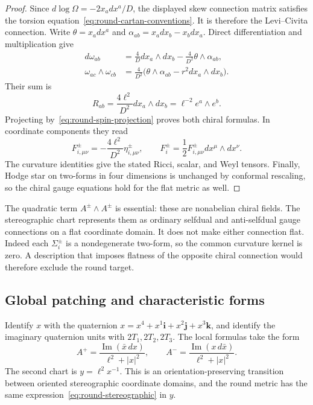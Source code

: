 \documentclass[11pt]{article}
\numberwithin{equation}{section}
\theoremstyle{definition}
\theoremstyle{remark}
\begin{document}
\begin{proof}
Since $d\log\Omega=-2x_a dx^a/D$, the displayed skew connection matrix
satisfies the torsion equation~\eqref{eq:round-cartan-conventions}.  It is
therefore the Levi--Civita connection.  Write $\theta=x_a dx^a$ and
$\alpha_{ab}=x_a dx_b-x_b dx_a$.  Direct differentiation and multiplication
give
\begin{align*}
 d\omega_{ab}
 &=\frac4D dx_a\wedge dx_b-
   \frac4{D^2}\theta\wedge\alpha_{ab},\\
 \omega_{ac}\wedge\omega_{cb}
 &=\frac4{D^2}\bigl(
   \theta\wedge\alpha_{ab}-r^2dx_a\wedge dx_b\bigr).
\end{align*}
Their sum is
\[
 R_{ab}=\frac{4\ell^2}{D^2}dx_a\wedge dx_b
       =\ell^{-2}e^a\wedge e^b.
\]
Projecting by~\eqref{eq:round-spin-projection} proves both chiral formulas.
In coordinate components they read
\begin{equation}
 F_{i,\mu\nu}^\pm=-\frac{4\ell^2}{D^2}\eta^\pm_{i,\mu\nu},
 \qquad
 F_i^\pm=\frac12F_{i,\mu\nu}^\pm dx^\mu\wedge dx^\nu.
 \label{eq:round-F-components}
\end{equation}
The curvature identities give the stated Ricci, scalar, and Weyl tensors.
Finally, Hodge star on two-forms in four dimensions is unchanged by conformal
rescaling, so the chiral gauge equations hold for the flat metric as well.
\end{proof}

The quadratic term \(A^\pm\wedge A^\pm\) is essential: these are nonabelian chiral fields. The stereographic chart represents them as ordinary selfdual and anti-selfdual gauge connections on a flat coordinate domain. It does not make either connection flat. Indeed each \(\Sigma_i^\pm\) is a nondegenerate two-form, so the common curvature kernel is zero. A description that imposes flatness of the opposite chiral connection would therefore exclude the round target.

\subsection{Global patching and characteristic forms}
\label{subsec:round-global}

Identify $x$ with the quaternion
$x=x^4+x^1\mathbf i+x^2\mathbf j+x^3\mathbf k$, and identify the imaginary
quaternion units with $2T_1,2T_2,2T_3$.  The local formulas take the form
\begin{equation}
 A^+=\frac{\operatorname{Im}(\bar x\,dx)}{\ell^2+|x|^2},
 \qquad
 A^-=\frac{\operatorname{Im}(x\,d\bar x)}{\ell^2+|x|^2}.
 \label{eq:round-quaternion-connections}
\end{equation}
The second chart is $y=\ell^2x^{-1}$.  This is an orientation-preserving
transition between oriented stereographic coordinate domains, and the round
metric has the same expression~\eqref{eq:round-stereographic} in $y$.
\end{document}
